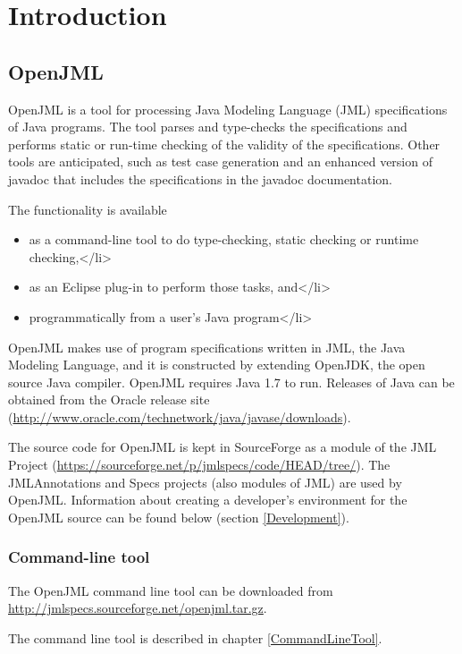\chapter{Introduction}

\section{OpenJML}

OpenJML is a tool for processing Java Modeling Language (JML) specifications of Java programs. 
The tool parses and type-checks the specifications and
performs static or run-time checking of the validity of the specifications. 
Other tools are anticipated, such as test case generation and
 an enhanced version of javadoc that includes the specifications in the
javadoc documentation.

The functionality is available 
\begin{itemize}
\item as a command-line tool to do type-checking, static checking or runtime checking,</li>
\item as an Eclipse plug-in to perform those tasks, and</li>
\item programmatically from a user's Java program</li>
\end{itemize}

OpenJML makes use of program specifications written in JML, the Java Modeling Language, and
it is constructed by extending OpenJDK, the open source Java compiler.
OpenJML requires Java 1.7 to run.
Releases of Java can be obtained from the Oracle release site (\url{http://www.oracle.com/technetwork/java/javase/downloads}).

The source code for OpenJML is kept in SourceForge as a module of the 
JML Project (\url{https://sourceforge.net/p/jmlspecs/code/HEAD/tree/}).
The JMLAnnotations and Specs projects (also modules of JML) are used by OpenJML.
Information about creating a developer's environment for the OpenJML source
can be found below (section \ref{Development}).
 
\subsection{Command-line tool}

The OpenJML command line tool can be downloaded from
\url{http://jmlspecs.sourceforge.net/openjml.tar.gz}.

The command line tool is described in chapter \ref{CommandLineTool}.

